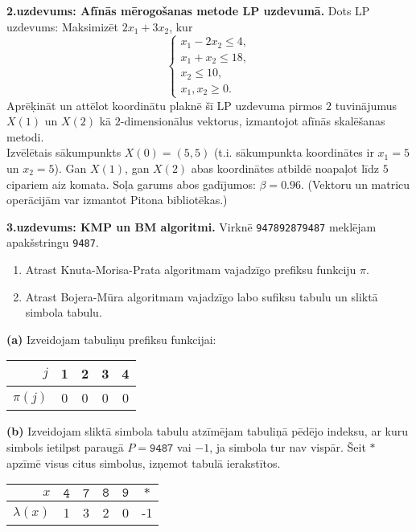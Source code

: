 \documentclass[11pt]{article}
\begin{document}
{\footnotesize
\vspace{10ex}
{\bf 2.uzdevums: Afīnās mērogošanas metode LP uzdevumā.}
Dots LP uzdevums: Maksimizēt $2x_1 + 3x_2$, kur
$$\left\{ \begin{array}{l}
x_1 - 2x_2 \leq 4,\\
x_1 + x_2 \leq 18,\\
x_2 \leq 10,\\
x_1,x_2 \geq 0.
\end{array} \right.$$
Aprēķināt un attēlot koordinātu plaknē šī LP uzdevuma pirmos $2$ tuvinājumus
$X(1)$ un $X(2)$ kā $2$-dimensionālus vektorus, izmantojot
afīnās skalēšanas metodi.\\
Izvēlētais sākumpunkts $X(0) = (5,5)$ (t.i. sākumpunkta
koordinātes ir $x_1 = 5$ un $x_2 = 5$). Gan $X(1)$, gan $X(2)$ abas koordinātes
atbildē noapaļot līdz $5$ cipariem aiz komata. Soļa garums abos
gadījumos: $\beta = 0.96$. (Vektoru un matricu operācijām var izmantot Pitona bibliotēkas.)
}






{\footnotesize
\vspace{10ex}
{\bf 3.uzdevums: KMP un BM algoritmi.}
Virknē {\tt 947892879487} meklējam apakšstringu {\tt 9487}.
\begin{enumerate}[label=(\alph*)]
\item Atrast Knuta-Morisa-Prata algoritmam vajadzīgo prefiksu funkciju $\pi$.
\item Atrast Bojera-Mūra algoritmam vajadzīgo labo sufiksu tabulu un sliktā simbola tabulu.
\end{enumerate}
}

\vspace{2ex}
{\bf (a)} Izveidojam tabuliņu prefiksu funkcijai:

\begin{tabular}{|r||c|c|c|c|} \hline
$j$ & 1 & 2 & 3 & 4 \\ \hline
$\pi(j)$ & 0 & 0 & 0 & 0 \\ \hline
\end{tabular}

{\bf (b)} Izveidojam sliktā simbola tabulu \textendash{} atzīmējam tabuliņā pēdējo indeksu,
ar kuru simbols ietilpst paraugā $P = \mathtt{9487}$ vai $-1$, ja simbola tur nav vispār.
Šeit $\mathtt{\ast}$ apzīmē visus citus simbolus, izņemot tabulā ierakstītos.

\begin{tabular}{|r||c|c|c|c|c|} \hline
$x$ & $\mathtt{4}$ & $\mathtt{7}$ & $\mathtt{8}$ & $\mathtt{9}$ & $\mathtt{\ast}$ \\ \hline
$\lambda(x)$ & 1 & 3 & 2 & 0 & -1 \\ \hline
\end{tabular}
\end{document}
